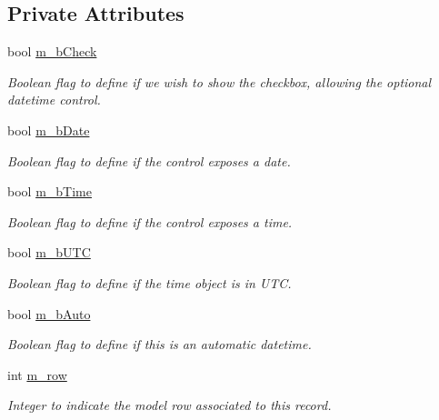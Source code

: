 \subsection*{Private Attributes}
\begin{DoxyCompactItemize}
\item 
bool \hyperlink{class_custom_time_ctrl_a24ca64a96066346b1d17414741143946}{m\_\-bCheck}
\begin{DoxyCompactList}\small\item\em Boolean flag to define if we wish to show the checkbox, allowing the optional datetime control. \item\end{DoxyCompactList}\item 
bool \hyperlink{class_custom_time_ctrl_ad400f22586d9744343b222469b7b044e}{m\_\-bDate}
\begin{DoxyCompactList}\small\item\em Boolean flag to define if the control exposes a date. \item\end{DoxyCompactList}\item 
bool \hyperlink{class_custom_time_ctrl_a0cf32d081f83b97e294f4170845a1439}{m\_\-bTime}
\begin{DoxyCompactList}\small\item\em Boolean flag to define if the control exposes a time. \item\end{DoxyCompactList}\item 
bool \hyperlink{class_custom_time_ctrl_a561551017a9fde5d281d23fa7c897903}{m\_\-bUTC}
\begin{DoxyCompactList}\small\item\em Boolean flag to define if the time object is in UTC. \item\end{DoxyCompactList}\item 
bool \hyperlink{class_custom_time_ctrl_a10051394dabcc7222ce57980c23a1554}{m\_\-bAuto}
\begin{DoxyCompactList}\small\item\em Boolean flag to define if this is an automatic datetime. \item\end{DoxyCompactList}\item 
int \hyperlink{class_custom_time_ctrl_aa0677acdf3557d4a7d63b6160f946d26}{m\_\-row}
\begin{DoxyCompactList}\small\item\em Integer to indicate the model row associated to this record. \item\end{DoxyCompactList}\end{DoxyCompactItemize}


